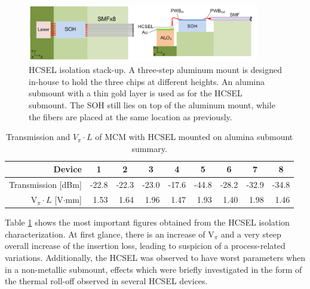 \begin{figure}[!ht]
\centering
  \includegraphics[width=0.9\textwidth]{visio/MCM2-SU}
  \caption{HCSEL isolation stack-up. A three-step aluminum mount is designed in-house to hold the three chips at different heights. An alumina submount with a thin gold layer is used as for the HCSEL submount. The SOH still lies on top of the aluminum mount, while the fibers are placed at the same location as previously.}
  \label{fig:MCM2-SU}
\end{figure}

\begin{table}[]
\centering
\begin{tabular}{@{}rrrrrrrrr@{}}
\toprule
Device                        & \multicolumn{1}{c}{1} & \multicolumn{1}{c}{2} & \multicolumn{1}{c}{3} & \multicolumn{1}{c}{4} & \multicolumn{1}{c}{5} & \multicolumn{1}{c}{6} & \multicolumn{1}{c}{7} & \multicolumn{1}{c}{8} \\ \midrule
Transmission {[}dBm{]}       & -22.8                  & -22.3                  & -23.0                  & -17.6                  & -44.8                  & -28.2                  & -32.9                  & -34.8                  \\
V$_\pi \cdot L$ {[}V$\cdot$mm{]} & 1.53                  & 1.64                  & 1.96                  & 1.47                  & 1.93                  & 1.40                  & 1.98                  & 1.46                  \\ \bottomrule
\end{tabular}
\caption{Transmission and $V_\pi \cdot L$ of MCM with HCSEL mounted on alumina submount summary.}
\label{tab:MCM2_sum}
\end{table}

Table \ref{tab:MCM2_sum} shows the most important figures obtained from the HCSEL isolation characterization. At first glance, there is an increase of V$_\pi$ and a very steep overall increase of the insertion loss, leading to suspicion of a process-related variations. Additionally, the HCSEL was observed to have worst parameters when in a non-metallic submount, effects which were briefly investigated in the form of the thermal roll-off observed in several HCSEL devices.

